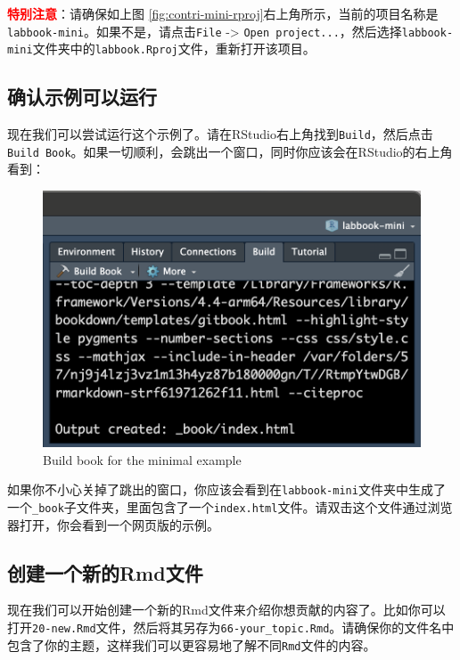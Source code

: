 \documentclass[]{ctexbook}
\theoremstyle{definition}
\theoremstyle{definition}
\theoremstyle{definition}
\theoremstyle{definition}
\theoremstyle{remark}
\begin{document}
\textcolor{red}{\textbf{特别注意}}：请确保如上图 \ref{fig:contri-mini-rproj}右上角所示，当前的项目名称是\texttt{labbook-mini}。如果不是，请点击\texttt{File} -\textgreater{} \texttt{Open\ project...}，然后选择\texttt{labbook-mini}文件夹中的\texttt{labbook.Rproj}文件，重新打开该项目。

\subsection{确认示例可以运行}\label{ux786eux8ba4ux793aux4f8bux53efux4ee5ux8fd0ux884c}

现在我们可以尝试运行这个示例了。请在RStudio右上角找到\texttt{Build}，然后点击\texttt{Build\ Book}。如果一切顺利，会跳出一个窗口，同时你应该会在RStudio的右上角看到：

\begin{figure}

{\centering \includegraphics[width=0.7\linewidth]{img/contribute/mini_build} 

}

\caption{Build book for the minimal example}\label{fig:contri-mini-build}
\end{figure}

如果你不小心关掉了跳出的窗口，你应该会看到在\texttt{labbook-mini}文件夹中生成了一个\texttt{\_book}子文件夹，里面包含了一个\texttt{index.html}文件。请双击这个文件通过浏览器打开，你会看到一个网页版的示例。

\subsection{创建一个新的Rmd文件}\label{ux521bux5efaux4e00ux4e2aux65b0ux7684rmdux6587ux4ef6}

现在我们可以开始创建一个新的Rmd文件来介绍你想贡献的内容了。比如你可以打开\texttt{20-new.Rmd}文件，然后将其另存为\texttt{66-your\_topic.Rmd}。请确保你的文件名中包含了你的主题，这样我们可以更容易地了解不同\texttt{Rmd}文件的内容。
\end{document}
